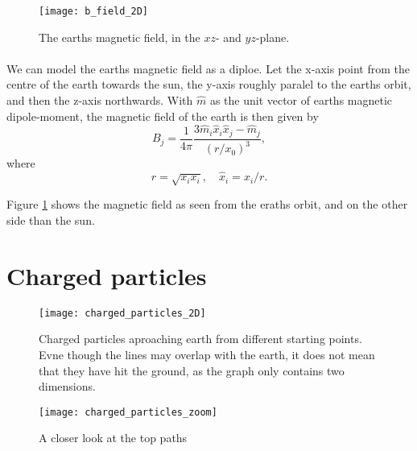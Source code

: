 \documentclass{article}
\begin{document}
    \begin{figure}
        \centering    
        \texttt{[image: b\_field\_2D]}
        \caption{The earths magnetic field, in the $xz$- and $yz$-plane.  }
        \label{B-field}
    \end{figure}

    \paragraph{}
    We can model the earths magnetic field as a diploe. Let the x-axis point from the centre of the earth towards the sun, the y-axis roughly paralel to the earths orbit, and then the z-axis northwards. With $\hat m$ as the unit vector of earths magnetic dipole-moment, the magnetic field of the earth is then given by
        \begin{equation}
            B_j = \frac{1}{4\pi} \frac{3\hat m_i \hat x_i \hat x_j - \hat m_j}{(r/x_0)^3},
        \end{equation}
        where
        \begin{equation*}
            r = \sqrt{x_ix_i}, \quad \hat x_i = x_i / r.
        \end{equation*}

        Figure \ref{B-field} shows the magnetic field as seen from the eraths orbit, and on the other side than the sun. 

    \section*{Charged particles}

    \begin{figure}
        \centering
        \vspace{-50px}
        \texttt{[image: charged\_particles\_2D]}
        \caption{Charged particles aproaching earth from different starting points. Evne though the lines may overlap with the earth, it does not mean that they have hit the ground, as the graph only contains two dimensions.}
        \label{Charged particles}
    \end{figure}

    \begin{figure}
        \centering
        \vspace{-50px}
        \texttt{[image: charged\_particles\_zoom]}
        \caption{A closer look at the top paths}
        \label{Charged particles zoom}
    \end{figure}
\end{document}
